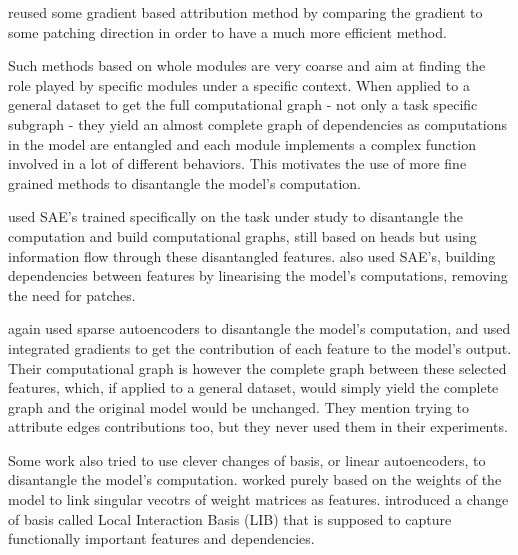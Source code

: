 \documentclass{article}
\begin{document}
\citet{syed2023attributionCircuits} reused some gradient based attribution method by comparing the gradient to some patching direction in order to have a much more efficient method.

Such methods based on whole modules are very coarse and aim at finding the role played by specific modules under a specific context. When applied to a general dataset to get the full computational graph - not only a task specific subgraph - they yield an almost complete graph of dependencies as computations in the model are entangled and each module implements a complex function involved in a lot of different behaviors. This motivates the use of more fine grained methods to disantangle the model's computation.


\citet{oneill2024sparse} used SAE's trained specifically on the task under study to disantangle the computation and build computational graphs, still based on heads but using information flow through these disantangled features. \citet{he2024dictionaryCircuits} also used SAE's, building dependencies between features by linearising the model's computations, removing the need for patches.%

\citet{marks2024sparseCircuits} again used sparse autoencoders to disantangle the model's computation, and used integrated gradients to get the contribution of each feature to the model's output. Their computational graph is however the complete graph between these selected features, which, if applied to a general dataset, would simply yield the complete graph and the original model would be unchanged. They mention trying to attribute edges contributions too, but they never used them in their experiments.

Some work also tried to use clever changes of basis, or linear autoencoders, to disantangle the model's computation. \citet{merullo2024talking} worked purely based on the weights of the model to link singular vecotrs of weight matrices as features. \citet{bushnaq2024using} introduced a change of basis called Local Interaction Basis (LIB) that is supposed to capture functionally important features and dependencies.
\end{document}
